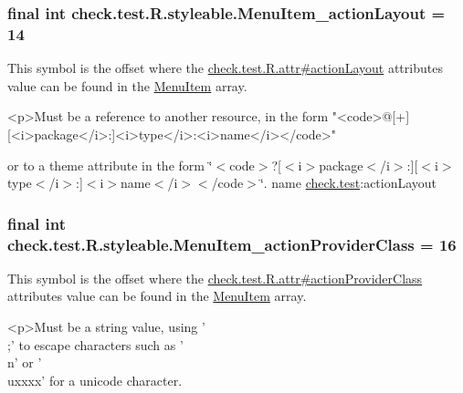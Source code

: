 \subsubsection[{Menu\+Item\+\_\+action\+Layout}]{\setlength{\rightskip}{0pt plus 5cm}final int check.\+test.\+R.\+styleable.\+Menu\+Item\+\_\+action\+Layout = 14\hspace{0.3cm}{\ttfamily [static]}}\label{classcheck_1_1test_1_1_r_1_1styleable_a1e6d157f94282edbc7543ea239b101bb}
This symbol is the offset where the \hyperlink{classcheck_1_1test_1_1_r_1_1attr_ab4b527b5796f4512de117247dbd35351}{check.\+test.\+R.\+attr\#action\+Layout} attribute\textquotesingle{}s value can be found in the \hyperlink{classcheck_1_1test_1_1_r_1_1styleable_af26376072eab01d1b4197e48992dc936}{Menu\+Item} array.

\begin{DoxyVerb}      <p>Must be a reference to another resource, in the form "<code>@[+][<i>package</i>:]<i>type</i>:<i>name</i></code>"
\end{DoxyVerb}
 or to a theme attribute in the form \char`\"{}$<$code$>$?\mbox{[}$<$i$>$package$<$/i$>$\+:\mbox{]}\mbox{[}$<$i$>$type$<$/i$>$\+:\mbox{]}$<$i$>$name$<$/i$>$$<$/code$>$\char`\"{}.  name \hyperlink{namespacecheck_1_1test}{check.\+test}\+:action\+Layout \hypertarget{classcheck_1_1test_1_1_r_1_1styleable_a1de7e291dacc4f22974c8384b8f76ee4}{}
\subsubsection[{Menu\+Item\+\_\+action\+Provider\+Class}]{\setlength{\rightskip}{0pt plus 5cm}final int check.\+test.\+R.\+styleable.\+Menu\+Item\+\_\+action\+Provider\+Class = 16\hspace{0.3cm}{\ttfamily [static]}}\label{classcheck_1_1test_1_1_r_1_1styleable_a1de7e291dacc4f22974c8384b8f76ee4}
This symbol is the offset where the \hyperlink{classcheck_1_1test_1_1_r_1_1attr_acf3e8e893c96f1ce1d297389b1eaf8af}{check.\+test.\+R.\+attr\#action\+Provider\+Class} attribute\textquotesingle{}s value can be found in the \hyperlink{classcheck_1_1test_1_1_r_1_1styleable_af26376072eab01d1b4197e48992dc936}{Menu\+Item} array.

\begin{DoxyVerb}      <p>Must be a string value, using '\\;' to escape characters such as '\\n' or '\\uxxxx' for a unicode character.
\end{DoxyVerb}
 

